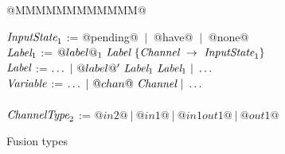 
\begin{figure}

\begin{tabbing}
@MMMMMMMMMMMM@   \TABDEF \kill

$\textit{InputState}_1$ \> := \> @pending@ $~|~$ @have@ $~|~$ @none@
\\
$\textit{Label}_1$ \> := \> $@label@_1~\textit{Label}~\{\textit{Channel} ~\to~ \textit{InputState}_1\}$ \\
$\textit{Label}$   \> := \> $\ldots ~|~@label@'~\textit{Label}_1~\textit{Label}_1 ~|~ \ldots$ \\
$\textit{Variable}$     \> := \> $\ldots ~|~@chan@~\textit{Channel} ~|~ \ldots$ \\
\\

$\textit{ChannelType}_2$   \> := \> $@in2@~|~@in1@~|~@in1out1@~|~@out1@$ \\
\end{tabbing}

\caption{Fusion types}
\label{fig:Fusion:Types}
\end{figure}

